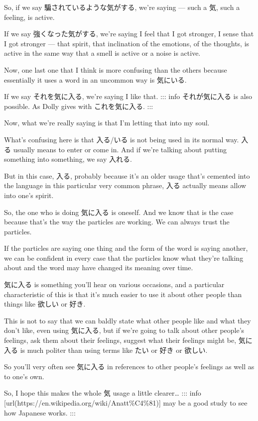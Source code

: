 So, if we say 騙されているような気がする, we're saying  --- such a 気, such a feeling, is active.

{}

If we say 強くなった気がする, we're saying I feel that I got stronger, I sense that I got stronger --- that spirit, that inclination of the emotions, of the thoughts, is active in the same way that a smell is active or a noise is active.

\stopsectionlevel

\startsectionlevel[title={気に入る},reference={気に入る}]

Now, one last one that I think is more confusing than the others because essentially it uses a word in an uncommon way is 気にいる.

If we say それを気に入る, we're saying I like that.\crlf
::: info それが気に入る is also possible. As Dolly gives with これを気に入る. :::

Now, what we're really saying is that I'm letting that into my soul.

{}

What's confusing here is that 入る/いる is not being used in its normal way. 入る usually means to enter or come in. And if we're talking about putting something into something, we say 入れる.

But in this case, 入る, probably because it's an older usage that's cemented into the language in this particular very common phrase, 入る actually means allow into one's spirit.

So, the one who is doing 気に入る is oneself. And we know that is the case because that's the way the particles are working. We can always trust the particles.

If the particles are saying one thing and the form of the word is saying another, we can be confident in every case that the particles know what they're talking about and the word may have changed its meaning over time.

気に入る is something you'll hear on various occasions, and a particular characteristic of this is that it's much easier to use it about other people than things like 欲しい or 好き.

This is not to say that we can baldly state what other people like and what they don't like, even using 気に入る, but if we're going to talk about other people's feelings, ask them about their feelings, suggest what their feelings might be, 気に入る is much politer than using terms like たい or 好き or 欲しい.

So you'll very often see 気に入る in references to other people's feelings as well as to one's own.

So, I hope this makes the whole 気 usage a little clearer\ldots{}\crlf
::: info [url(https://en.wikipedia.org/wiki/Anatt\%C4\%81)] may be a good study to see how Japanese works. ::: {}

\stopsectionlevel

\stopsectionlevel
